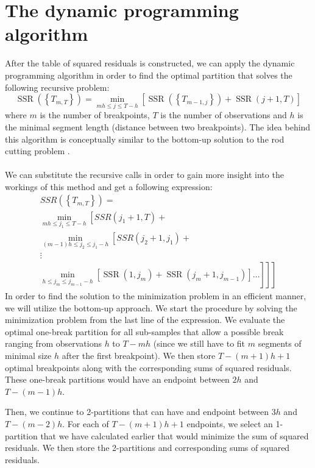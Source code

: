 \documentclass[main.tex]{subfiles}
\begin{document}
\section{The dynamic programming algorithm}
\label{sec:dynamic_algorithm}
After the table of squared residuals is constructed, we can apply the dynamic
programming algorithm in order to find the optimal partition that solves the
following recursive problem:
\[
\operatorname{SSR}\left(\left\{T_{m, T}\right\}\right)=\min _{m h \leq j \leq
  T-h}\left[\operatorname{SSR}\left(\left\{T_{m-1,
    j}\right\}\right)+\operatorname{SSR}(j+1, T)\right]
\]
where $m$ is the number of breakpoints, $T$ is the number of observations and
$h$ is the minimal segment length (distance between two breakpoints). The idea
behind this algorithm is conceptually similar to the bottom-up solution to
the rod cutting problem \cite{CLRS_rod}. \\\\
We can substitute the recursive calls in order to gain more insight into the workings of this method
and get a following expression:
\[
\begin{array}{c}
  S S R\left(\left\{T_{m, T}\right\}\right)= \\
  \min _{m h \leq j_{1} \leq T-h}\left[S S R\left(j_{1}+1, T\right)+\right. \\
  \min _{(m-1) h \leq j_{2} \leq j_{1}-h}\left[S S R\left(j_{2}+1, j_{1}\right)+\right. \\
  \vdots \\
  \left.\left.\left.\min _{h \leq j_{m} \leq j_{m-1}-h}
  \left[\operatorname{SSR}\left(1, j_{m}\right)+\operatorname{SSR}\left(j_{m}+1, j_{m-1}\right)\right]
  \ldots\right]\right]\right]
\end{array}
\]
In order to find the solution to the minimization problem in an efficient
manner, we will utilize the bottom-up approach.
We start the procedure by solving the minimization problem from the
last line of the expression. We evaluate the optimal one-break partition for all
sub-samples that allow a possible break ranging from observations $h$ to
$T - mh$ (since we still have to fit $m$ segments of minimal size $h$ after
the first breakpoint). We then store $T - (m + 1)h + 1$ optimal breakpoints
along with the corresponding sums of squared residuals. These one-break
partitions would have an endpoint between $2h$ and $T - (m-1)h$. 

Then, we continue to 2-partitions that can have and endpoint between $3h$ and
$T - (m-2)h$. For each of $T - (m + 1)h + 1$ endpoints, we select an
1-partition that we have calculated earlier that would minimize the sum of
squared residuals. We then store the 2-partitions and corresponding sums of
squared residuals.
\end{document}
